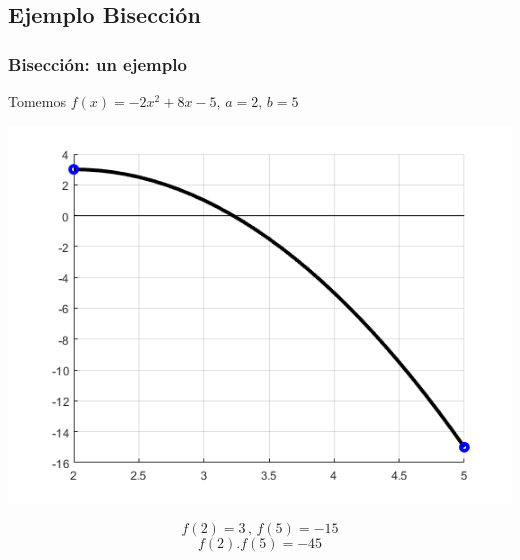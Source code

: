 \documentclass[xcolor=svgnames]{beamer} %
\theoremstyle{plain}
\theoremstyle{definition}
\begin{document}
\subsection{Ejemplo Bisección}
\begin{frame}
\frametitle{Bisección: un ejemplo}
Tomemos $f(x) = -2x^2+8x-5, \, a=2, \, b=5$
\begin{minipage}{.7\linewidth}
\includegraphics[scale=.5]{Biseccion/f0.png} 
\end{minipage}
\begin{minipage}{.25\linewidth}
$$f(2)=3 \,,\,f(5)=-15$$\vspace{7pt}
$$f(2).f(5) = -45$$\vspace{7pt}

\end{minipage}
\end{frame}
\end{document}
